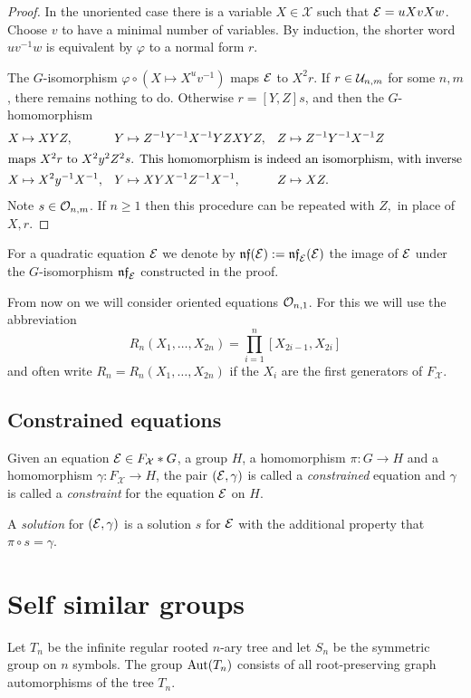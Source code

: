 \documentclass[a4paper,11pt]{amsart}
\begin{document}
\begin{proof}
  In the unoriented case there is a variable $X\in\mathcal{X}$ such that
  $\mathcal{E} = uXvXw$. Choose $v$ to have a minimal number of variables.
  By induction, the shorter word
  $uv^{-1}w$ is equivalent by $\varphi$ to a normal form $r$.
 
  The $G$-isomorphism $\varphi \circ (X\mapsto X^uv^{-1})$ maps $\mathcal{E}$ to
  $X^2r$. If $r\in \mathcal{U}_{n,m}$ for some $n,m$,
  there remains nothing to do.  Otherwise $r=[Y,Z]s$, and then the
  $G$-homomorphism
  \begin{align*}
    X&\mapsto XYZ, & Y&\mapsto Z^{-1}Y^{-1}X^{-1}YZXYZ, & Z&\mapsto Z^{-1}Y^{-1}X^{-1}Z \\
  \intertext{maps $X^2r$ to $X^2y^2Z^2s$. This homomorphism is indeed an
  isomorphism, with inverse}
    X&\mapsto X^2y^{-1}X^{-1}, & Y&\mapsto XYX^{-1}Z^{-1}X^{-1}, & Z&\mapsto XZ.
  \end{align*}
  Note $s \in \mathcal{O}_{n,m}$. If $n\geq 1$ then this procedure can be repeated with
  $Z,$ in place of $X,r$.
\end{proof}
For a quadratic equation $\mathcal{E}$ we denote by $\mathfrak{nf}(\mathcal{E}) := \mathfrak{nf}_{\mathcal{E}}(\mathcal{E})$
the image of $\mathcal{E}$ under the $G$-isomorphism $\mathfrak{nf}_{\mathcal{E}}$ constructed in
the proof.

From now on we will consider oriented equations $\mathcal{O}_{n,1}$. For this
we will use the abbreviation
\[R_n(X_1,\dotsc,X_{2n})=\prod_{i=1}^n [X_{2i-1},X_{2i}]\]
and often write $R_n=R_n(X_1,\dotsc,X_{2n})$ if the $X_i$ are the
first generators of $F_{\mathcal{X}}$.

\subsection{Constrained equations}
\begin{defi}
  Given an equation $\mathcal{E} \in F_{\mathcal{X}}*G$, a group $H$, a homomorphism
  $\pi\colon G \to H$ and a homomorphism $\gamma\colon F_{\mathcal{X}} \to H$, the
  pair $(\mathcal{E},\gamma)$ is called a \emph{constrained} equation and
  $\gamma$ is called a \emph{constraint} for the equation $\mathcal{E}$ on $H$.
 
  A \emph{solution} for $(\mathcal{E},\gamma)$ is a solution $s$ for $\mathcal{E}$ with the
  additional property that $\pi\circ s=\gamma$.
\end{defi}

\section{Self similar groups}\label{sec:SelfSimilarGroups}
Let $T_n$ be the infinite regular rooted $n$-ary tree and let $S_n$ be the symmetric group on $n$ symbols.
The group $\operatorname{{Aut}}(T_n)$ consists of all root-preserving graph automorphisms of the tree $T_n$. 
\end{document}
